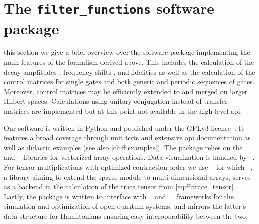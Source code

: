 \chapter{The \texttt{filter\_functions} software package}\label{ch:ff:software}
 this section we give a brief overview over the \filterfunctions software package implementing the main features of the formalism derived above.
This includes the calculation of the decay amplitudes \decayamps, frequency shifts \freqshifts, and fidelities as well as the calculation of the control matrices for single gates and both generic and periodic sequences of gates.
Moreover, control matrices may be efficiently extended to and merged on larger Hilbert spaces.
Calculations using unitary conjugation instead of transfer matrices are implemented but at this point not available in the high-level \gls{api}.

Our software is written in Python and published under the GPLv3 license~\cite{Hangleiter_ff}.
It features a broad coverage through unit tests and extensive \gls{api} documentation as well as didactic examples (see also \cref{ch:ff:examples}).
The package relies on the \numpy~\cite{Harris2020} and \scipy~\cite{Virtanen2020} libraries for vectorized array operations.
Data visualization is handled by \matplotlib~\cite{Hunter2007}.
For tensor multiplications with optimized contraction order we use \opteinsum~\cite{Smith2018} for which \sparse~\cite{Pydata2019}, a library aiming to extend the \scipy sparse module to multi-dimensional arrays, serves as a backend in the calculation of the trace tensor from \cref{eq:ff:trace_tensor}.
Lastly, the package is written to interface with \qopt~\cite{Teske2022} and \qutip~\cite{Johansson2012}, frameworks for the simulation and optimization of open quantum systems, and mirrors the latter's data structure for Hamiltonians ensuring easy interoperability between the two.


